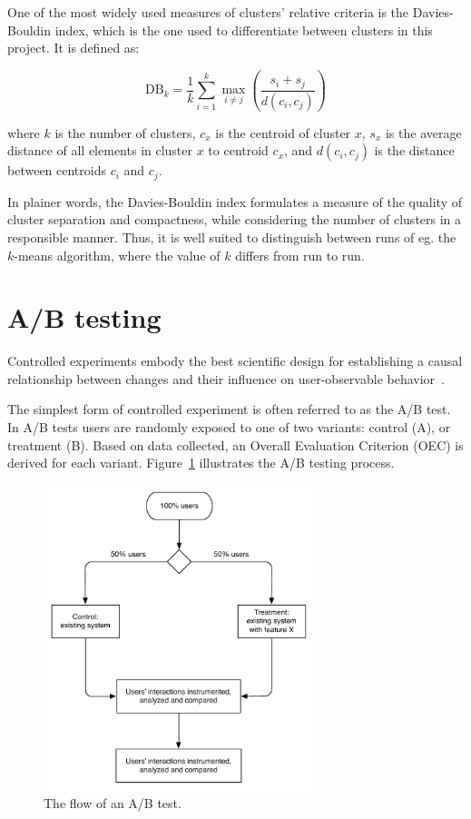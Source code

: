 One of the most widely used measures of clusters' relative criteria is the Davies-Bouldin index, which is the one used to differentiate between clusters in this project. It is defined as:

\begin{equation}
  \text{DB}_k = \frac{1}{k} \sum_{i=1}^k \max_{i \neq j} \left( \frac{s_i + s_j}{d(c_i, c_j)} \right)
\end{equation}

where $k$ is the number of clusters, $c_x$ is the centroid of cluster $x$, $s_x$ is the average distance of all elements in cluster $x$ to centroid $c_x$, and $d(c_i,c_j)$ is the distance between centroids $c_i$ and $c_j$.

In plainer words, the Davies-Bouldin index formulates a measure of the quality of cluster separation and compactness, while considering the number of clusters in a responsible manner. Thus, it is well suited to distinguish between runs of eg. the $k$-means algorithm, where the value of $k$ differs from run to run.

\section{A/B testing}
\label{survey:sec:ab_testing}

Controlled experiments embody the best scientific design for establishing a causal relationship between changes and their influence on user-observable behavior~\cite{Kohavi2007,Kohavi2008}.

The simplest form of controlled experiment is often referred to as the A/B test. In A/B tests users are randomly exposed to one of two variants: control (A), or treatment (B). Based on data collected, an Overall Evaluation Criterion (OEC) is derived for each variant. Figure~\ref{fig:ab_flow} illustrates the A/B testing process.

\begin{figure}[h]
  \centering
    \includegraphics[width=0.7\textwidth]{Figures/ab-test-flow}
    \caption{The flow of an A/B test.}
    \label{fig:ab_flow}
\end{figure}


